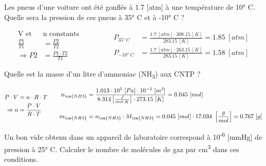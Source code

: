 \documentclass[
  11pt,
  french,
  a4paper,
  openany]{book}
\begin{document}
\begin{Exercise}

Les pneus d'une voiture ont été gonflés à 1.7 {[}atm{]} à une température de 10° C. Quelle sera la pression de ces pneus à 35° C et à -10° C ?



\end{Exercise}

\begin{Answer}
\[
\begin{split}
    \text{V et } & \text{n constants}\\
    \frac{P1}{T1} &= \frac{P2}{T2} \\
    \Rightarrow P2 &= \frac{P1 \cdot T2}{T1}
\end{split}
\qquad\qquad
\begin{split}
    P_{35°\ C} &= \frac{1.7\ [atm] \cdot 308.15\ [K]}{283.15\ [K]} = 1.85\ [atm] \\[1em]
    P_{-10°\ C} &= \frac{1.7\ [atm] \cdot 263.15\ [K]}{283.15\ [K]} = 1.58\ [atm]
\end{split}
\]

\end{Answer}

\begin{Exercise}

Quelle est la masse d'un litre d'ammoniac (NH\textsubscript{3}) aux CNTP ?



\end{Exercise}

\begin{Answer}
\[
\begin{split}
    P \cdot V &= n \cdot R \cdot T \\
    \Rightarrow n &= \frac{P \cdot V}{R \cdot T}
\end{split}
\qquad
\begin{split}
    n_{\ce{NH3}} &= \frac{1.013 \cdot 10^{5}\ [Pa] \cdot 10^{-3}\ [m^3]}{8.314 \left[\frac{J}{mol \cdot K}\right] \cdot 273.15\ [K]} = 0.045\ [mol] \\[1em]
    m_{\ce{NH3}} &= n_{\ce{NH3}} \cdot M_{\ce{NH3}} = 0.045\ [mol] \cdot 17.034\ \left[\frac{g}{mol}\right] = 0.767\ [g]
\end{split}
\]

\end{Answer}

\begin{Exercise}

Un bon vide obtenu dans un appareil de laboratoire correspond à 10\textsuperscript{-6} {[}mmHg{]} de pression à 25° C. Calculer le nombre de molécules de gaz par cm\textsuperscript{3} dans ces conditions.



\end{Exercise}
\end{document}
